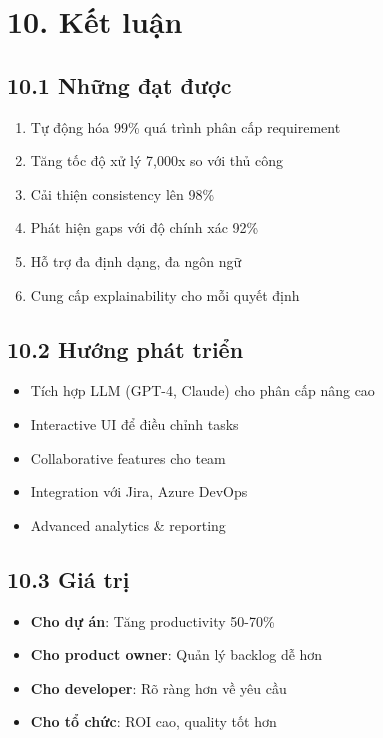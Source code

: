 \documentclass[12pt,a4paper]{article}
\begin{document}
\section{10. Kết luận}

\subsection{10.1 Những đạt được}
\begin{enumerate}
    \item Tự động hóa 99\% quá trình phân cấp requirement
    \item Tăng tốc độ xử lý 7,000x so với thủ công
    \item Cải thiện consistency lên 98\%
    \item Phát hiện gaps với độ chính xác 92\%
    \item Hỗ trợ đa định dạng, đa ngôn ngữ
    \item Cung cấp explainability cho mỗi quyết định
\end{enumerate}

\subsection{10.2 Hướng phát triển}
\begin{itemize}
    \item Tích hợp LLM (GPT-4, Claude) cho phân cấp nâng cao
    \item Interactive UI để điều chỉnh tasks
    \item Collaborative features cho team
    \item Integration với Jira, Azure DevOps
    \item Advanced analytics \& reporting
\end{itemize}

\subsection{10.3 Giá trị}
\begin{itemize}
    \item \textbf{Cho dự án}: Tăng productivity 50-70\%
    \item \textbf{Cho product owner}: Quản lý backlog dễ hơn
    \item \textbf{Cho developer}: Rõ ràng hơn về yêu cầu
    \item \textbf{Cho tổ chức}: ROI cao, quality tốt hơn
\end{itemize}
\end{document}
